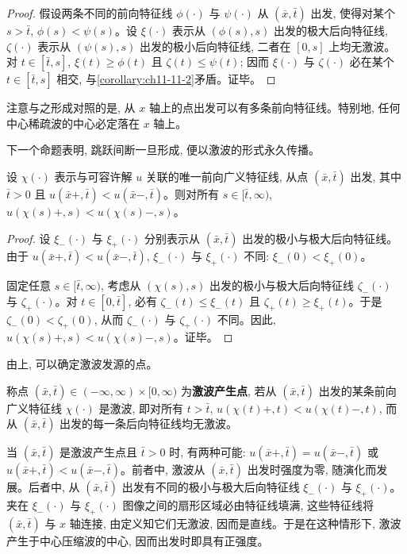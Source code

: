 \documentclass[../../main.tex]{subfiles}
\begin{document}
\begin{proof}
假设两条不同的前向特征线 $\phi(\cdot)$ 与 $\psi(\cdot)$ 从 $(\bar x,\bar t)$ 出发, 使得对某个 $s>\bar t$, $\phi(s)<\psi(s)$。设 $\xi(\cdot)$ 表示从 $(\phi(s),s)$ 出发的极大后向特征线, $\zeta(\cdot)$ 表示从 $(\psi(s),s)$ 出发的极小后向特征线, 二者在 $[0,s]$ 上均无激波。对 $t\in[\bar t,s]$, $\xi(t)\geqslant\phi(t)$ 且 $\zeta(t)\leqslant\psi(t)$; 因而 $\xi(\cdot)$ 与 $\zeta(\cdot)$ 必在某个 $t\in[\bar t,s]$ 相交, 与\cref{corollary:ch11-11-2}矛盾。证毕。
\end{proof}

注意与之形成对照的是, 从 $x$ 轴上的点出发可以有多条前向特征线。特别地, 任何中心稀疏波的中心必定落在 $x$ 轴上。

下一个命题表明, 跳跃间断一旦形成, 便以激波的形式永久传播。

\begin{theorem}\label{theorem:ch11-11-5}
设 $\chi(\cdot)$ 表示与可容许解 $u$ 关联的唯一前向广义特征线, 从点 $(\bar x,\bar t)$ 出发, 其中 $\bar t>0$ 且 $u(\bar x+,\bar t)<u(\bar x-,\bar t)$。则对所有 $s\in[\bar t,\infty)$, $u(\chi(s)+,s)<u(\chi(s)-,s)$。
\end{theorem}

\begin{proof}
设 $\xi_-(\cdot)$ 与 $\xi_+(\cdot)$ 分别表示从 $(\bar x,\bar t)$ 出发的极小与极大后向特征线。由于 $u(\bar x+,\bar t)<u(\bar x-,\bar t)$, $\xi_-(\cdot)$ 与 $\xi_+(\cdot)$ 不同: $\xi_-(0)<\xi_+(0)$。

固定任意 $s\in[\bar t,\infty)$, 考虑从 $(\chi(s),s)$ 出发的极小与极大后向特征线 $\zeta_-(\cdot)$ 与 $\zeta_+(\cdot)$。对 $t\in[0,\bar t]$, 必有 $\zeta_-(t)\leqslant\xi_-(t)$ 且 $\zeta_+(t)\geqslant\xi_+(t)$。于是 $\zeta_-(0)<\zeta_+(0)$, 从而 $\zeta_-(\cdot)$ 与 $\zeta_+(\cdot)$ 不同。因此, $u(\chi(s)+,s)<u(\chi(s)-,s)$。证毕。
\end{proof}

由上, 可以确定激波发源的点。

\begin{definition}\label{definition:ch11-11-6}
称点 $(\bar x,\bar t)\in(-\infty,\infty)\times[0,\infty)$ 为\textbf{激波产生点}, 若从 $(\bar x,\bar t)$ 出发的某条前向广义特征线 $\chi(\cdot)$ 是激波, 即对所有 $t>\bar t$, $u(\chi(t)+,t)<u(\chi(t)-,t)$, 而从 $(\bar x,\bar t)$ 出发的每一条后向特征线均无激波。
\end{definition}

当 $(\bar x,\bar t)$ 是激波产生点且 $\bar t>0$ 时, 有两种可能: $u(\bar x+,\bar t)=u(\bar x-,\bar t)$ 或 $u(\bar x+,\bar t)<u(\bar x-,\bar t)$。前者中, 激波从 $(\bar x,\bar t)$ 出发时强度为零, 随演化而发展。后者中, 从 $(\bar x,\bar t)$ 出发有不同的极小与极大后向特征线 $\xi_-(\cdot)$ 与 $\xi_+(\cdot)$。夹在 $\xi_-(\cdot)$ 与 $\xi_+(\cdot)$ 图像之间的扇形区域必由特征线填满, 这些特征线将 $(\bar x,\bar t)$ 与 $x$ 轴连接, 由定义知它们无激波, 因而是直线。于是在这种情形下, 激波产生于中心压缩波的中心, 因而出发时即具有正强度。
\end{document}
